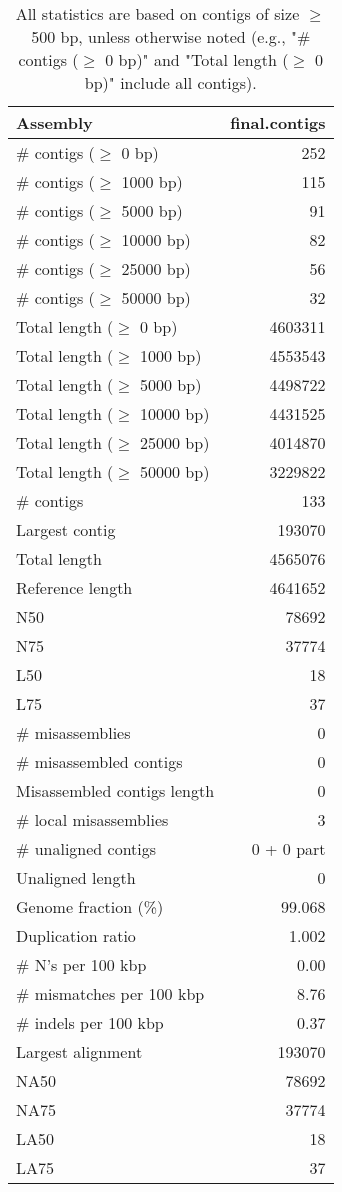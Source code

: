 \documentclass[12pt,a4paper]{article}
\begin{document}
\begin{table}[ht]
\begin{center}
\caption{All statistics are based on contigs of size $\geq$ 500 bp, unless otherwise noted (e.g., "\# contigs ($\geq$ 0 bp)" and "Total length ($\geq$ 0 bp)" include all contigs).}
\begin{tabular}{|l*{1}{|r}|}
\hline
Assembly & final.contigs \\ \hline
\# contigs ($\geq$ 0 bp) & 252 \\ \hline
\# contigs ($\geq$ 1000 bp) & 115 \\ \hline
\# contigs ($\geq$ 5000 bp) & 91 \\ \hline
\# contigs ($\geq$ 10000 bp) & 82 \\ \hline
\# contigs ($\geq$ 25000 bp) & 56 \\ \hline
\# contigs ($\geq$ 50000 bp) & 32 \\ \hline
Total length ($\geq$ 0 bp) & 4603311 \\ \hline
Total length ($\geq$ 1000 bp) & 4553543 \\ \hline
Total length ($\geq$ 5000 bp) & 4498722 \\ \hline
Total length ($\geq$ 10000 bp) & 4431525 \\ \hline
Total length ($\geq$ 25000 bp) & 4014870 \\ \hline
Total length ($\geq$ 50000 bp) & 3229822 \\ \hline
\# contigs & 133 \\ \hline
Largest contig & 193070 \\ \hline
Total length & 4565076 \\ \hline
Reference length & 4641652 \\ \hline
N50 & 78692 \\ \hline
N75 & 37774 \\ \hline
L50 & 18 \\ \hline
L75 & 37 \\ \hline
\# misassemblies & 0 \\ \hline
\# misassembled contigs & 0 \\ \hline
Misassembled contigs length & 0 \\ \hline
\# local misassemblies & 3 \\ \hline
\# unaligned contigs & 0 + 0 part \\ \hline
Unaligned length & 0 \\ \hline
Genome fraction (\%) & 99.068 \\ \hline
Duplication ratio & 1.002 \\ \hline
\# N's per 100 kbp & 0.00 \\ \hline
\# mismatches per 100 kbp & 8.76 \\ \hline
\# indels per 100 kbp & 0.37 \\ \hline
Largest alignment & 193070 \\ \hline
NA50 & 78692 \\ \hline
NA75 & 37774 \\ \hline
LA50 & 18 \\ \hline
LA75 & 37 \\ \hline
\end{tabular}
\end{center}
\end{table}
\end{document}

